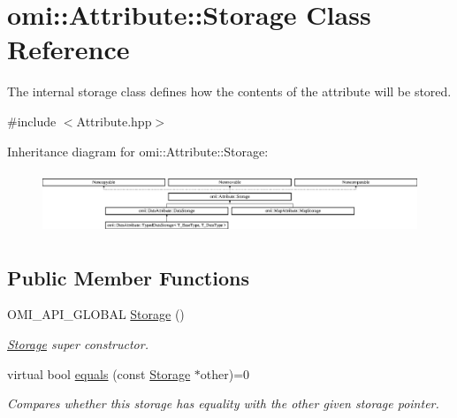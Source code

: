\hypertarget{classomi_1_1_attribute_1_1_storage}{}\section{omi\+:\+:Attribute\+:\+:Storage Class Reference}
\label{classomi_1_1_attribute_1_1_storage}


The internal storage class defines how the contents of the attribute will be stored.  




{\ttfamily \#include $<$Attribute.\+hpp$>$}

Inheritance diagram for omi\+:\+:Attribute\+:\+:Storage\+:\begin{figure}[H]
\begin{center}
\leavevmode
\includegraphics[height=1.866667cm]{classomi_1_1_attribute_1_1_storage}
\end{center}
\end{figure}
\subsection*{Public Member Functions}
\begin{DoxyCompactItemize}
\item 
O\+M\+I\+\_\+\+A\+P\+I\+\_\+\+G\+L\+O\+B\+AL \hyperlink{classomi_1_1_attribute_1_1_storage_a1abb81f3be684beeb8b14e92a89f81b1}{Storage} ()\hypertarget{classomi_1_1_attribute_1_1_storage_a1abb81f3be684beeb8b14e92a89f81b1}{}\label{classomi_1_1_attribute_1_1_storage_a1abb81f3be684beeb8b14e92a89f81b1}

\begin{DoxyCompactList}\small\item\em \hyperlink{classomi_1_1_attribute_1_1_storage}{Storage} super constructor. \end{DoxyCompactList}\item 
virtual bool \hyperlink{classomi_1_1_attribute_1_1_storage_aeae8905b885221ee472b741fedf233cc}{equals} (const \hyperlink{classomi_1_1_attribute_1_1_storage}{Storage} $\ast$other)=0\hypertarget{classomi_1_1_attribute_1_1_storage_aeae8905b885221ee472b741fedf233cc}{}\label{classomi_1_1_attribute_1_1_storage_aeae8905b885221ee472b741fedf233cc}

\begin{DoxyCompactList}\small\item\em Compares whether this storage has equality with the other given storage pointer. \end{DoxyCompactList}\end{DoxyCompactItemize}
